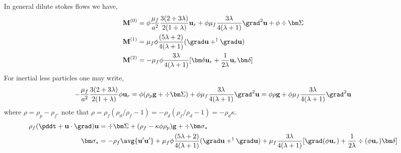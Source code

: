 In general dilute stokes flows we have, 
\begin{align}
    \textbf{M}^{(0)} 
    &=
    \phi
    \frac{\mu_f}{a^2}
    \frac{3(2+3\lambda)}{2(1+\lambda)}\textbf{u}_r
    + \phi\mu_f  \frac{3\lambda}{4(\lambda +1)} \grad^2 \textbf{u}
    + \phi \div\bm\Sigma
    \\
    \textbf{M}^{(1)} 
    &= \mu_f \phi 
    \frac{(5\lambda +2)}{4(\lambda +1)}(\grad \textbf{u}+ ^\dagger\grad \textbf{u}) 
    \\
    \textbf{M}^{(2)} 
    &=
    - \mu_f \phi \frac{3\lambda}{4(\lambda +1)}[\bm\delta \textbf{u}_r + \frac{1}{2\lambda}\textbf{u}_r \bm\delta ]
\end{align}
For inertial less particles one may write,
\begin{align*}
    -
    \frac{\mu_f}{a^2}
    \frac{3(2+3\lambda)}{2(1+\lambda)}\phi\textbf{u}_r
    =
    \phi(\rho_p \textbf{g} + \div\bm\Sigma)
    + \phi\mu_f  \frac{3\lambda}{4(\lambda +1)} \grad^2 \textbf{u}
    =
    \phi\rho\textbf{g} 
    + \phi\mu_f  \frac{3\lambda}{4(\lambda +1)} \grad^2 \textbf{u}
\end{align*}
where $\rho = \rho_p -\rho_f$. note that $\rho = \rho_f (\rho_d /\rho_f -1) = -\rho_d (\rho_f /\rho_d -1) = -\rho_d\kappa$. 
\begin{align}
    \rho_f (\pddt + \textbf{u} \cdot \grad)\textbf{u}
    &= 
    \div\bm\Sigma
    + (\rho_f - \kappa \phi \rho_p) \textbf{g}
    + \div \bm\sigma_*
    \\
    \bm\sigma_* &= 
    - \rho_f \avg{\textbf{u}'\textbf{u}'}
    +  \mu_f \phi 
    \frac{(5\lambda +2)}{4(\lambda +1)}(\grad \textbf{u}+ ^\dagger\grad \textbf{u}) 
    + \mu_f \frac{3\lambda}{4(\lambda +1)}[\grad(\phi \textbf{u}_r) + \frac{1}{2\lambda}\div(\phi\textbf{u}_r) \bm\delta ]
\end{align}


